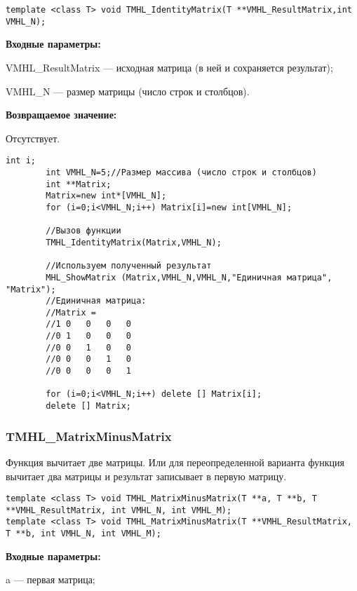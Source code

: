 \documentclass[a4paper,12pt]{article}
\begin{document}
\begin{lstlisting}[label=code_syntax_TMHL_IdentityMatrix,caption=Синтаксис]
template <class T> void TMHL_IdentityMatrix(T **VMHL_ResultMatrix,int VMHL_N);
\end{lstlisting}

\textbf{Входные параметры:}  
 
VMHL\_ResultMatrix --- исходная матрица (в ней и сохраняется результат);
 
VMHL\_N --- размер матрицы (число строк и столбцов).

\textbf{Возвращаемое значение:}

Отсутствует.


\begin{lstlisting}[label=code_use_TMHL_IdentityMatrix,caption=Пример использования]
        int i;
        int VMHL_N=5;//Размер массива (число строк и столбцов)
        int **Matrix;
        Matrix=new int*[VMHL_N];
        for (i=0;i<VMHL_N;i++) Matrix[i]=new int[VMHL_N];

        //Вызов функции
        TMHL_IdentityMatrix(Matrix,VMHL_N);

        //Используем полученный результат
        MHL_ShowMatrix (Matrix,VMHL_N,VMHL_N,"Единичная матрица", "Matrix");
        //Единичная матрица:
        //Matrix =
        //1	0	0	0	0
        //0	1	0	0	0
        //0	0	1	0	0
        //0	0	0	1	0
        //0	0	0	0	1

        for (i=0;i<VMHL_N;i++) delete [] Matrix[i];
        delete [] Matrix;
\end{lstlisting}

\subsubsection{TMHL\_MatrixMinusMatrix}\label{TMHL_MatrixMinusMatrix}

Функция вычитает две матрицы. Или для переопределенной варианта функция вычитает два матрицы и результат записывает в первую матрицу. 


\begin{lstlisting}[label=code_syntax_TMHL_MatrixMinusMatrix,caption=Синтаксис]
template <class T> void TMHL_MatrixMinusMatrix(T **a, T **b, T **VMHL_ResultMatrix, int VMHL_N, int VMHL_M);
template <class T> void TMHL_MatrixMinusMatrix(T **VMHL_ResultMatrix, T **b, int VMHL_N, int VMHL_M);
\end{lstlisting}

\textbf{Входные параметры:}

 a --- первая матрица;
 
\end{document}
